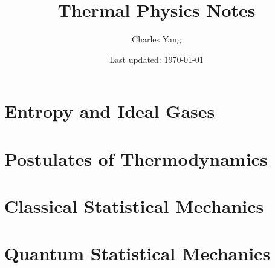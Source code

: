 \documentclass[12pt]{book}
\title{Thermal Physics Notes}
\author{Charles Yang}
\date{Last updated: \today}
\begin{document}

\frontmatter
\setcounter{tocdepth}{1}
\tableofcontents
\mainmatter

\part{Entropy and Ideal Gases}





\part{Postulates of Thermodynamics}










\part{Classical Statistical Mechanics}





\part{Quantum Statistical Mechanics}









\end{document}
